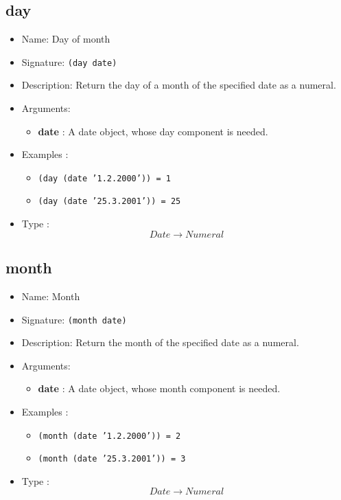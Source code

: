 \subsection{day}
\begin{itemize}
    \item Name: Day of month
    \item Signature: \texttt{(day date)}
    \item Description: Return the day of a month of the specified date as a numeral.
    \item Arguments:
        \begin{itemize}
            \item \textbf{date} : A date object, whose day component is needed.
        \end{itemize}
    \item Examples :
        \begin{itemize}
            \item \texttt{(day (date '1.2.2000')) = 1}
            \item \texttt{(day (date '25.3.2001')) = 25}
        \end{itemize}
    \item Type : \[ Date \to Numeral \]
\end{itemize}

\subsection{month}
\begin{itemize}
    \item Name: Month
    \item Signature: \texttt{(month date)}
    \item Description: Return the month of the specified date as a numeral.
    \item Arguments:
        \begin{itemize}
            \item \textbf{date} : A date object, whose month component is needed.
        \end{itemize}
    \item Examples :
        \begin{itemize}
            \item \texttt{(month (date '1.2.2000')) = 2}
            \item \texttt{(month (date '25.3.2001')) = 3}
        \end{itemize}
    \item Type : \[ Date \to Numeral \]
\end{itemize}

